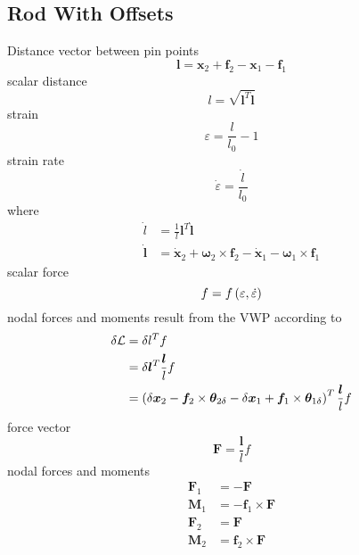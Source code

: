\documentclass[10pt,dvips,fleqn,subeqn]{report}
\newcommand{\T}[1]{\bm{#1}}
\begin{document}
\subsection{Rod With Offsets}
Distance vector between pin points
\begin{equation}
	\T{l} = \T{x}_2 + \T{f}_2 - \T{x}_1 - \T{f}_1
\end{equation}
scalar distance
\begin{equation}
	l = \sqrt{\T{l}^T \T{l}}
\end{equation}
strain
\begin{equation}
	\varepsilon = \frac{l}{l_0} - 1
\end{equation}
strain rate
\begin{equation}
	\dot{\varepsilon} = \frac{\dot{l}}{l_0}
\end{equation}
where
\begin{subequations}
\begin{align}
	\dot{l} &= \frac{1}{l} \T{l}^T \dot{\T{l}} \\
	\dot{\T{l}} &= \dot{\T{x}}_2 + \T{\omega}_2 \times \T{f}_2
		- \dot{\T{x}}_1 - \T{\omega}_1 \times \T{f}_1
\end{align}
\end{subequations}
scalar force
\begin{equation}
	f = f\left( \varepsilon, \dot{\varepsilon} \right)
\end{equation}
nodal forces and moments result from the VWP according to
\begin{subequations}
\begin{align}
	\delta \mathcal{L} &= \delta l^T f \\
	&= \delta\T{l}^T \frac{\T{l}}{l} f \\
	&= \plbr{
		\delta\T{x}_2
		- \T{f}_2 \times \T{\theta}_{2\delta}
		- \delta\T{x}_1
		+ \T{f}_1 \times \T{\theta}_{1\delta}
	}^T \frac{\T{l}}{l} f
\end{align}
\end{subequations}
force vector
\begin{equation}
	\T{F} = \frac{\T{l}}{l} f
\end{equation}
nodal forces and moments
\begin{subequations}
\begin{align}
	\T{F}_1 &= -\T{F} \\
	\T{M}_1 &= -\T{f}_1 \times \T{F} \\
	\T{F}_2 &= \T{F} \\
	\T{M}_2 &= \T{f}_2 \times \T{F}
\end{align}
\end{subequations}
\end{document}
